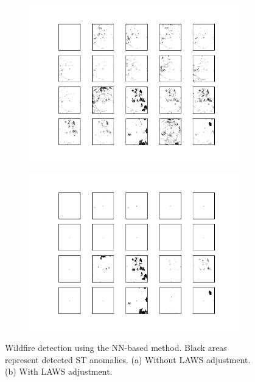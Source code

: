 \documentclass[11pt]{article}
\begin{document}
\begin{figure}[H]
     \centering
     
      \begin{subfigure}[b]{0.45\textwidth}
		\centering
		\includegraphics[width=\textwidth]{../figure/nn_no_laws.png}
		\caption{}
	 \end{subfigure}
         \hfill
      \begin{subfigure}[b]{0.45\textwidth}
         \includegraphics[width=\textwidth]{../figure/nn_laws.png}
         \caption{}
     \end{subfigure}
         \caption{Wildfire detection using the NN-based method. Black areas represent detected ST anomalies. (a) Without LAWS adjustment. (b) With LAWS adjustment.}
      \label{fig: nn_real_data}
\end{figure}
\end{document}
